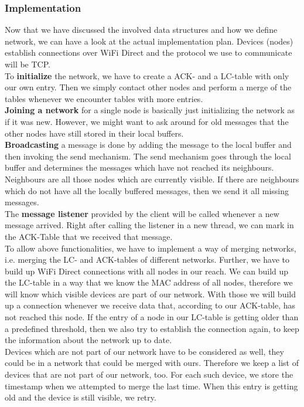 	\subsubsection{Implementation}
Now that we have discussed the involved data structures and how we define network, we can have a look at the actual implementation plan. Devices (nodes) establish connections over WiFi Direct and the protocol we use to communicate will be TCP.\\
To \textbf{initialize} the network, we have to create a ACK- and a LC-table with only our own entry. Then we simply contact other nodes and perform a merge of the tables whenever we encounter tables with more entries. \\
\textbf{Joining a network} for a single node is basically just initializing the network as if it was new. However, we might want to ask around for old messages that the other nodes have still stored in their local buffers. \\ 
\textbf{Broadcasting} a message is done by adding the message to the local buffer and then invoking the send mechanism. The send mechanism goes through the local buffer and determines the messages which have not reached its neighbours. Neighbours are all those nodes which are currently visible. If there are neighbours which do not have all the locally buffered messages, then we send it all missing messages.\\
The \textbf{message listener} provided by the client will be called whenever a new message arrived. Right after calling the listener in a new thread, we can mark in the ACK-Table that we received that message.  \\
To allow above functionalities, we have to implement a way of merging networks, i.e. merging the LC- and ACK-tables of different networks. Further, we have to build up WiFi Direct connections with all nodes in our reach. We can build up the LC-table in a way that we know the MAC address of all nodes, therefore we will know which visible devices are part of our network. With those we will build up a connection whenever we receive data that, according to our ACK-table, has not reached this node. If the entry of a node in our LC-table is getting older than a predefined threshold, then we also try to establish the connection again, to keep the information about the network up to date. \\
Devices which are not part of our network have to be considered as well, they could be in a network that could be merged with ours. Therefore we keep a list of devices that are not part of our network, too. For each such device, we store the timestamp when we attempted to merge the last time. When this entry is getting old and the device is still visible, we retry. \\

